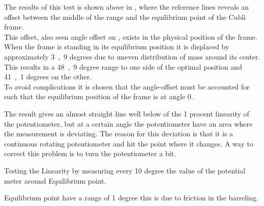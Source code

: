 \begin{minipage}{\linewidth}
\begin{minipage}{0.45\linewidth}
\begin{figure}[H]
  			\centering
  			\captionsetup{justification=centering}
  			\vspace{-.5cm}
  			\label{PotentiometerResolutionRadDeg}
  		\end{figure}\vspace{-5mm}
  	\end{minipage}
\end{minipage}

The results of this test is shown above in , where the reference lines reveals an offset between the middle of the range and the equilibrium point of the Cubli frame.\\
This offset, also seen angle offset on , exists in the physical position of the frame. When the frame is standing in its equilibrium position it is displaced by approximately \si{3,9} degrees due to uneven distribution of mass around its center.\\
This results in a \si{48,9} degree range to one side of the optimal position and \si{41,1} degrees on the other.\\
To avoid complications it is chosen that the angle-offset must be accounted for such that the equilibrium position of the frame is at angle 0.


The result gives an almost straight line well below of the 1 procent linearity of the potentiometer, but at a certain angle the potentiometer have an area where the measurement is deviating. The reason for this deviation is that it is a continuous rotating potentiometer and hit the point where it changes. A way to correct this problem is to turn the potentiometer a bit. 

Testing the Linearity by measuring every 10 degree the value of the potential meter around Equilibrium point.

Equilibrium point have a range of 1 degree this is due to friction in the barreling.



